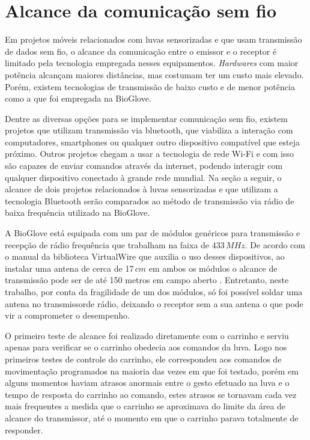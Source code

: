 \documentclass[
	12pt,				%
	openright,			%
	oneside,			%
	a4paper,			%
	english,			%
	brazil				%
	]{abntex2}
\begin{document}
			\section{Alcance da comunicação sem fio}

		Em projetos móveis relacionados com luvas sensorizadas e que usam transmissão de dados sem fio, o alcance da comunicação entre o emissor e o receptor é limitado pela tecnologia empregada nesses equipamentos. \textit{Hardwares} com maior potência alcançam maiores distâncias, mas costumam ter um custo mais elevado. Porém, existem tecnologias de transmissão de baixo custo e de menor potência como a que foi empregada na BioGlove. 
			
		Dentre as diversas opções para se implementar comunicação sem fio, existem projetos que utilizam transmissão via bluetooth, que viabiliza a interação com computadores, smartphones ou qualquer outro dispositivo compatível que esteja próximo. Outros projetos chegam a usar a tecnologia de rede Wi-Fi e com isso são capazes de enviar comandos através da internet, podendo interagir com qualquer dispositivo conectado à grande rede mundial. Na seção a seguir, o alcance de dois projetos relacionados à luvas sensorizadas e que utilizam a tecnologia Bluetooth serão comparados ao método de transmissão via rádio de baixa frequência utilizado na BioGlove.

		A BioGlove está equipada com um par de módulos genéricos para transmissão e recepção de rádio frequência que trabalham na faixa de 433$\,MHz$. De acordo com o manual da biblioteca VirtualWire que auxilia o uso desses dispositivos, ao instalar uma antena de cerca de 17$\,cm$ em ambos os módulos o alcance de transmissão pode ser de até 150 metros em campo aberto \cite{virtualwiremanual}. Entretanto, neste trabalho, por conta da fragilidade de um dos módulos, só foi possível soldar uma antena no transmissorde rádio, deixando o receptor sem a sua antena o que pode vir a comprometer o desempenho.

		O primeiro teste de alcance foi realizado diretamente com o carrinho e serviu apenas para verificar se o carrinho obedecia aos comandos da luva. Logo nos primeiros testes de controle do carrinho, ele correspondeu aos comandos de movimentação programados na maioria das vezes em que foi testado, porém em alguns momentos haviam atrasos anormais entre o gesto efetuado na luva e o tempo de resposta do carrinho ao comando, estes atrasos se tornavam cada vez mais frequentes a medida que o carrinho se aproximava do limite da área de alcance do transmissor, até o momento em que o carrinho parava totalmente de responder.
\end{document}
